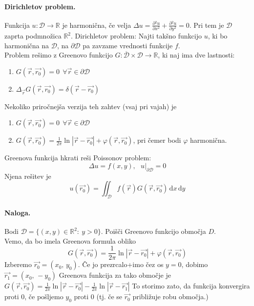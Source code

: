 \documentclass[a4paper]{article}
\newcommand{\vct}[1]{\overrightarrow{#1}}
\newcommand{\dif}{\mathrm{d}}
\newcommand{\pd}[2]{\frac{\partial {#1}}{\partial {#2}}}
\newcommand{\R}{\mathbb{R}}
\newcommand{\fn}[3]{{#1}\colon {#2} \rightarrow {#3}}
\begin{document}
\paragraph{Dirichletov problem.} Funkcija $\fn{u}{\mathcal{D}}{\R}$ je harmonična, če velja $\displaystyle{\Delta u = \pd{^2u}{x^2} + \pd{^2u}{y^2} = 0}$. Pri tem je $\mathcal{D}$ zaprta podmnožica $\R^2$.
Dirichletov problem: Najti takšno funkcijo $u$, ki bo harmonična na $\mathcal{D}$, na $\mathcal{\partial D}$ pa zavzame vrednosti funkcije $f$. \\
Problem rešimo z Greenovo funkcijo $\fn{G}{\overline{\mathcal{D}} \times \mathcal{D}}{\R}$, ki naj ima dve lastnosti:
\begin{enumerate}
    \item $G(\vct{r}, \vct{r_0}) = 0 ~~ \forall\vct{r}\in\partial\mathcal{D}$
    \item $\Delta_{\vct{r}} G(\vct{r}, \vct{r_0}) = \delta(\vct{r} - \vct{r_0})$
\end{enumerate}
Nekoliko priročnejša verzija teh zahtev (vsaj pri vajah) je
\begin{enumerate}
    \item $G(\vct{r}, \vct{r_0}) = 0 ~~ \forall\vct{r}\in\partial\mathcal{D}$
    \item $G(\vct{r}, \vct{r_0}) = \frac{1}{2\pi}\ln\left|\vct{r} - \vct{r_0}\right| + \varphi(\vct{r}, \vct{r_0})$, pri čemer bodi $\varphi$ harmonična.
\end{enumerate}
Greenova funkcija hkrati reši Poissonov problem:
$$\Delta u = f(x,y),~~~u\Big|_{\partial\mathcal{D}} = 0$$
Njena rešitev je $$u(\vct{r_0}) = \iint_{\mathcal{D}} f(\vct{r})G(\vct{r},\vct{r_0})\,\dif x\,\dif y$$
\paragraph{Naloga.} Bodi $\mathcal{D} = \{(x, y) \in \R^2\colon~y>0\}$. Poišči Greenovo funkcijo območja $D$. \\[3mm]
Vemo, da bo imela Greenova formula obliko
$$G(\vct{r}, \vct{r_0}) = \frac{1}{2\pi}\ln\left|\vct{r}-\vct{r_0}\right|+\varphi(\vct{r},\vct{r_0})$$
Izberemo $\vct{r_0} = (x_0,\,y_0)$. Če jo prezrcalo+imo čez os $y=0$, dobimo $\vct{r_1} = (x_0,\,-y_0)$
Greenova funkcija za tako območje je $\displaystyle{G(\vct{r}, \vct{r_0}) = \frac{1}{2\pi}\ln\left|\vct{r} - \vct{r_0}\right| - \frac{1}{2\pi}\ln\left|\vct{r} - \vct{r_1}\right|}$
To storimo zato, da funkcija konvergira proti 0, če pošljemo $y_0$ proti $0$ (tj. če se $\vct{r_0}$ približuje robu območja.)
\end{document}
